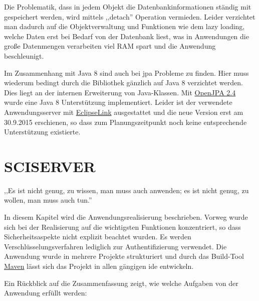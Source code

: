 \documentclass[oneside, ngerman, toc=bibliography,bibliography=totoc,listof=entryprefix, open=right,numbers=noenddot,fontsize=12pt]{scrbook}
\newcommand\chapmd[2]{\begin{mdframed}[%
		rightline=false,leftline=false,topline=false,bottomline=false,frametitlerule=false,
		userdefinedwidth=\textwidth,frametitlealignment=\flushright, %
		frametitlerulecolor=black,frametitle={\small #1}]
		\flushright{} \footnotesize{} #2
	\end{mdframed}}
\begin{document}
Die Problematik, dass in jedem Objekt die Datenbankinformationen ständig mit gespeichert werden, wird mittels {,,detach''} Operation vermieden. Leider verzichtet man dadurch auf die Objektverwaltung und Funktionen wie dem {lazy loading}, welche Daten erst bei Bedarf von der Datenbank liest, was in Anwendungen die große Datenmengen verarbeiten viel RAM spart und die Anwendung beschleunigt.

Im  Zusammenhang mit Java 8 sind auch bei \acrshort{jpa} Probleme zu finden. Hier muss wiederum bedingt durch die Bibliothek gänzlich auf Java 8 verzichtet werden.
Dies liegt an der internen Erweiterung von Java-Klassen. Mit \href{http://openjpa.apache.org/openjpa-2.4.x.html}{OpenJPA 2.4} wurde eine Java 8 Unterstützung implementiert. Leider ist der verwendete Anwendungsserver mit \href{http://www.eclipse.org/eclipselink/}{EclipseLink} ausgestattet und die neue Version erst am 30.9.2015 erschienen, so dass zum Planungszeitpunkt noch keine entsprechende Unterstützung existierte.




\chapter{SCISERVER}
\chapmd{ Johann Wolfgang von Goethe (Werk: Wilhelm Meisters Wanderjahre)}{,,Es ist nicht genug, zu wissen, man muss auch anwenden; es ist nicht genug, zu wollen, man muss auch tun.''}


In diesem Kapitel wird die Anwendungsrealisierung beschrieben. Vorweg wurde sich bei der Realisierung auf die wichtigsten Funktionen konzentriert, so dass Sicherheitsaspekte nicht explizit beachtet wurden. Es werden Verschlüsselungsverfahren lediglich zur Authentifizierung verwendet. Die Anwendung wurde in mehrere Projekte strukturiert und durch das Build-Tool \href{https://maven.apache.org/}{{Maven}}  lässt sich das Projekt in allen gängigen \acrshort{ide} entwickeln. 


\bigskip
Ein Rückblick auf die Zusammenfassung zeigt, wie welche Aufgaben von der Anwendung erfüllt werden:
\end{document}
